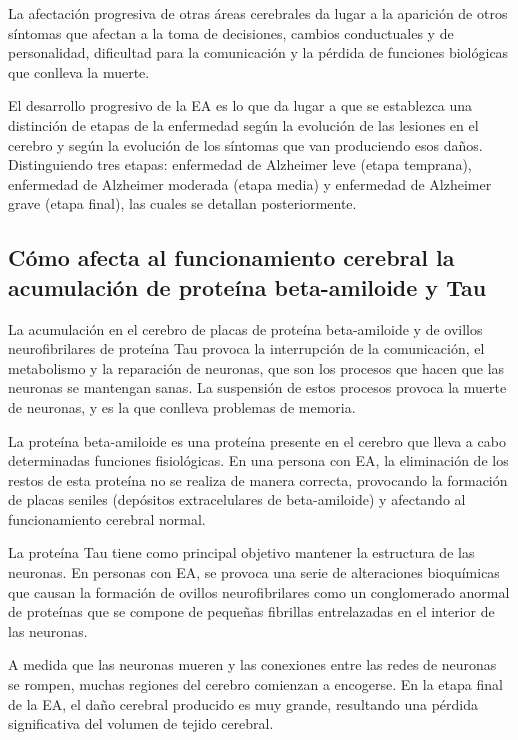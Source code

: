 La afectación progresiva de otras áreas cerebrales da lugar a la aparición de otros síntomas que afectan a la toma de
decisiones, cambios conductuales y de personalidad, dificultad para la comunicación y la pérdida de funciones biológicas
que conlleva la muerte.

El desarrollo progresivo de la EA es lo que da lugar a que se establezca una distinción de etapas de la enfermedad según
la evolución de las lesiones en el cerebro y según la evolución de los síntomas que van produciendo esos daños.
Distinguiendo tres etapas: enfermedad de Alzheimer leve (etapa temprana), enfermedad de Alzheimer moderada (etapa media)
y enfermedad de Alzheimer grave (etapa final), las cuales se detallan posteriormente.

\subsection{Cómo afecta al funcionamiento cerebral la acumulación de proteína beta-amiloide y Tau}
\label{subsec:acumulacion-proteínas}
La acumulación en el cerebro de placas de proteína beta-amiloide y de ovillos neurofibrilares de proteína Tau provoca la
interrupción de la comunicación, el metabolismo y la reparación de neuronas, que son los procesos que hacen que las
neuronas se mantengan sanas.
La suspensión de estos procesos provoca la muerte de neuronas, y es la que conlleva problemas de memoria.

La proteína beta-amiloide es una proteína presente en el cerebro que lleva a cabo determinadas funciones fisiológicas.
En una persona con EA, la eliminación de los restos de esta proteína no se realiza de manera correcta, provocando la
formación de placas seniles (depósitos extracelulares de beta-amiloide) y afectando al funcionamiento cerebral normal.


La proteína Tau tiene como principal objetivo mantener la estructura de las neuronas.
En personas con EA, se provoca una serie de alteraciones bioquímicas que causan la formación de ovillos neurofibrilares
como un conglomerado anormal de proteínas que se compone de pequeñas fibrillas entrelazadas en el interior de las
neuronas.

A medida que las neuronas mueren y las conexiones entre las redes de neuronas se rompen, muchas regiones del cerebro
comienzan a encogerse.
En la etapa final de la EA, el daño cerebral producido es muy grande, resultando una pérdida significativa del volumen
de tejido cerebral.

